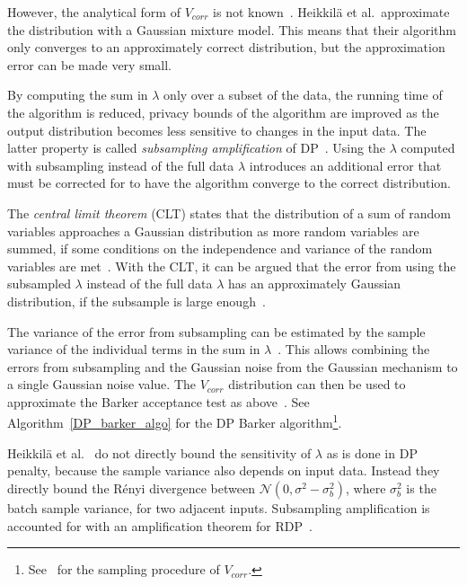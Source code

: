 \documentclass[english,twoside,openright]{HYgraduMLDS}
\newcommand{\caln}{{\mathcal{N}}}
\begin{document}
However, the analytical form of \(V_{corr}\) is not known~\cite{HeikkilaJDH19}.
Heikkilä et al.\  approximate the distribution with a Gaussian mixture model.
This means that their 
algorithm only converges to an approximately correct distribution, but the 
approximation error can be made very small.

By computing the sum in \(\lambda\) only over a subset of the data, the
running time of the algorithm is reduced, privacy bounds of the algorithm
are improved as the output distribution becomes less sensitive to changes in
the input data. The latter property is called \emph{subsampling amplification}
of DP~\cite{WangBK19}. Using the \(\lambda\) computed
with subsampling instead of the full data \(\lambda\) introduces an additional 
error that must be corrected for to have the algorithm converge to the correct 
distribution. 

The \emph{central limit theorem} (CLT) states that the distribution of a sum 
of random variables approaches a Gaussian distribution as more random variables 
are summed, if some conditions on the independence and variance of the random 
variables are met~\cite{SPC17}. With the CLT, it can be argued
that the error from 
using the subsampled \(\lambda\) instead of the full data \(\lambda\) has an 
approximately Gaussian distribution, if the subsample is large 
enough~\cite{SPC17}.

The variance of the error from subsampling can 
be estimated by the sample variance of the individual terms in the sum in 
\(\lambda\)~\cite{SPC17}. This allows combining the errors from subsampling and the
Gaussian noise from the Gaussian mechanism to a single Gaussian noise value.
The \(V_{corr}\) distribution can then be used to approximate the Barker acceptance 
test as above~\cite{HeikkilaJDH19}. See Algorithm~\ref{DP_barker_algo} for the DP Barker
algorithm\footnote{
    See~\cite{HeikkilaJDH19} for the sampling procedure of \(V_{corr}\).
}.

Heikkilä et al.~\cite{HeikkilaJDH19} do not directly bound the sensitivity
of \(\lambda\) as is done in DP penalty, because the sample variance also 
depends on input data. Instead they directly bound the Rényi divergence 
between \(\caln(0, \sigma^2 - \sigma^2_b)\), where \(\sigma^2_b\) is the 
batch sample variance, for two adjacent inputs. Subsampling amplification 
is accounted for with an amplification theorem for RDP~\cite{WangBK19}.
\end{document}

